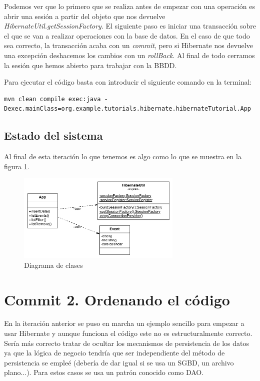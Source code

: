 \documentclass{article}
\begin{document}
	Podemos ver que lo primero que se realiza antes de empezar con una operación es abrir una sesión a partir del objeto que nos devuelve \emph{HibernateUtil.getSessionFactory}. El siguiente paso es iniciar una transacción sobre el que se van a realizar operaciones con la base de datos. En el caso de que todo sea correcto, la transacción acaba con un \emph{commit}, pero si Hibernate nos devuelve una excepción deshacemos los cambios con un \emph{rollBack}. Al final de todo cerramos la sesión que hemos abierto para trabajar con la BBDD.

	Para ejecutar el código basta con introducir el siguiente comando en la terminal:
\begin{lstlisting}[style=bash]
mvn clean compile exec:java -Dexec.mainClass=org.example.tutorials.hibernate.hibernateTutorial.App
\end{lstlisting}

\subsection{Estado del sistema}
	Al final de esta iteración lo que tenemos es algo como lo que se muestra en la figura \ref{fig:c01:UmlClass}.
\begin{figure}[h]
  \centering
    \includegraphics[width=0.7\textwidth]{commit01/img/UmlClass.pdf}
  \caption{Diagrama de clases}
  \label{fig:c01:UmlClass}
\end{figure}	
	
\section{Commit 2. Ordenando el código}
	En la iteración anterior se puso en marcha un ejemplo sencillo para empezar a usar Hibernate y aunque funciona el código este no es estructuralmente correcto. Sería más correcto tratar de ocultar los mecanismos de persistencia de los datos ya que la lógica de negocio tendría que ser independiente del método de persistencia se empleé (debería de dar igual si se usa un SGBD, un archivo plano...). Para estos casos se usa un patrón conocido como DAO\cite{Dao}.
\end{document}
